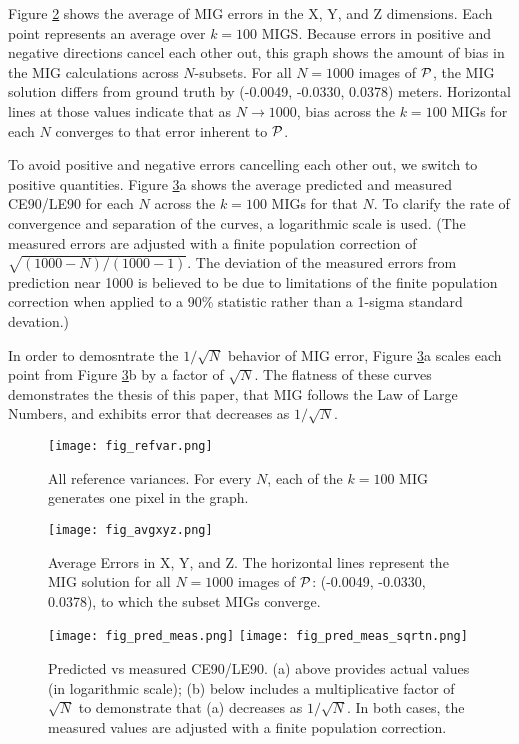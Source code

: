 \documentclass[11pt]{amsart}
\begin{document}
Figure \ref{fig:vanillaxyz} shows the average of MIG errors in the X, Y, and Z
dimensions. Each point represents an average over $k=100$ MIGS. Because errors
in positive and negative directions cancel each other out, this graph shows the
amount of bias in the MIG calculations across $N$-subsets. For all $N=1000$
images of $\mathcal{P}$, the MIG solution differs from ground truth by (-0.0049,
-0.0330, 0.0378) meters. Horizontal lines at those values indicate that as
$N\rightarrow 1000$, bias across the $k=100$ MIGs for each $N$ converges to that
error inherent to $\mathcal{P}$.

To avoid positive and negative errors cancelling each other out, we switch to
positive quantities. Figure \ref{fig:vanilla_pred_meas}a shows the average
predicted and measured CE90/LE90 for each $N$ across the $k=100$ MIGs for that
$N$. To clarify the rate of convergence and separation of the curves, a
logarithmic scale is used. (The measured errors are adjusted with a finite
population correction of $\sqrt{(1000-N)/(1000-1)}$. The deviation of the
measured errors from prediction near 1000 is believed to be due to limitations
of the finite population correction when applied to a 90\% statistic rather than
a 1-sigma standard devation.)

In order to demosntrate the $1/\sqrt{N}$ behavior of MIG error, Figure
\ref{fig:vanilla_pred_meas}a scales each point from Figure
\ref{fig:vanilla_pred_meas}b by a factor of $\sqrt N$. The flatness of these
curves demonstrates the thesis of this paper, that MIG follows the Law of Large
Numbers, and exhibits error that decreases as $1/\sqrt N$.


\begin{figure}
\texttt{[image: fig\_refvar.png]}
\caption{\label{fig:vanillaref}All reference variances. For every $N$, each of
  the $k=100$ MIG generates one pixel in the graph.}
\end{figure}

\begin{figure}
\texttt{[image: fig\_avgxyz.png]}
\caption{\label{fig:vanillaxyz}Average Errors in X, Y, and Z. The horizontal
  lines represent the MIG solution for all $N=1000$ images of $\mathcal{P}$: (-0.0049,
  -0.0330, 0.0378), to which the subset MIGs converge.}
\end{figure}

\begin{figure}
\texttt{[image: fig\_pred\_meas.png]}
\texttt{[image: fig\_pred\_meas\_sqrtn.png]}
\caption{\label{fig:vanilla_pred_meas}Predicted vs measured CE90/LE90. (a) above
  provides actual values (in logarithmic scale); (b) below includes a
  multiplicative factor of $\sqrt{N}$ to demonstrate that (a) decreases as
  $1/\sqrt{N}$. In both cases, the measured values are adjusted with a finite
  population correction.}
\end{figure}
\end{document}

